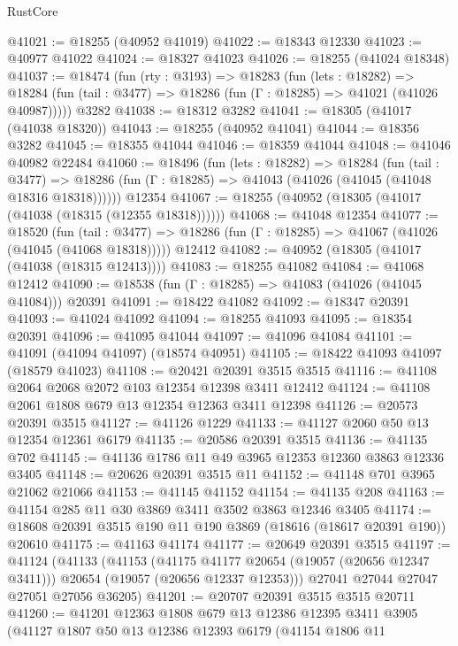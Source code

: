 \begin{lexlean}{RustCore}
\begin{coremodule}
@41021 := @18255 (@40952 @41019)
@41022 := @18343 @12330
@41023 := @40977 @41022
@41024 := @18327 @41023
@41026 := @18255 (@41024 @18348)
@41037 := @18474
    (fun (rty : @3193) =>
    @18283
      (fun (lets : @18282) =>
      @18284 (fun (tail : @3477) => @18286 (fun (Γ : @18285) => @41021 (@41026 @40987)))))
    @3282
@41038 := @18312 @3282
@41041 := @18305 (@41017 (@41038 @18320))
@41043 := @18255 (@40952 @41041)
@41044 := @18356 @3282
@41045 := @18355 @41044
@41046 := @18359 @41044
@41048 := @41046 @40982 @22484
@41060 := @18496
    (fun (lets : @18282) =>
    @18284
      (fun (tail : @3477) =>
      @18286 (fun (Γ : @18285) => @41043 (@41026 (@41045 (@41048 @18316 @18318))))))
    @12354
@41067 := @18255 (@40952 (@18305 (@41017 (@41038 (@18315 (@12355 @18318))))))
@41068 := @41048 @12354
@41077 := @18520
    (fun (tail : @3477) => @18286 (fun (Γ : @18285) => @41067 (@41026 (@41045 (@41068 @18318)))))
    @12412
@41082 := @40952 (@18305 (@41017 (@41038 (@18315 @12413))))
@41083 := @18255 @41082
@41084 := @41068 @12412
@41090 := @18538 (fun (Γ : @18285) => @41083 (@41026 (@41045 @41084))) @20391
@41091 := @18422 @41082
@41092 := @18347 @20391
@41093 := @41024 @41092
@41094 := @18255 @41093
@41095 := @18354 @20391
@41096 := @41095 @41044
@41097 := @41096 @41084
@41101 := @41091 (@41094 @41097) (@18574 @40951)
@41105 := @18422 @41093 @41097 (@18579 @41023)
@41108 := @20421 @20391 @3515 @3515
@41116 := @41108 @2064 @2068 @2072 @103 @12354 @12398 @3411 @12412
@41124 := @41108 @2061 @1808 @679 @13 @12354 @12363 @3411 @12398
@41126 := @20573 @20391 @3515
@41127 := @41126 @1229
@41133 := @41127 @2060 @50 @13 @12354 @12361 @6179
@41135 := @20586 @20391 @3515
@41136 := @41135 @702
@41145 := @41136 @1786 @11 @49 @3965 @12353 @12360 @3863 @12336 @3405
@41148 := @20626 @20391 @3515 @11
@41152 := @41148 @701 @3965 @21062 @21066
@41153 := @41145 @41152
@41154 := @41135 @208
@41163 := @41154 @285 @11 @30 @3869 @3411 @3502 @3863 @12346 @3405
@41174 := @18608 @20391 @3515 @190 @11 @190 @3869 (@18616 (@18617 @20391 @190)) @20610
@41175 := @41163 @41174
@41177 := @20649 @20391 @3515
@41197 := @41124
    (@41133
      (@41153
        (@41175 @41177 @20654 (@19057 (@20656 @12347 @3411)))
        @20654
        (@19057 (@20656 @12337 @12353)))
      @27041
      @27044
      @27047
      @27051
      @27056
      @36205)
@41201 := @20707 @20391 @3515 @3515 @20711
@41260 := @41201
    @12363
    @1808
    @679
    @13
    @12386
    @12395
    @3411
    @3905
    (@41127
      @1807
      @50
      @13
      @12386
      @12393
      @6179
      (@41154
        @1806
        @11

\end{coremodule}
\end{lexlean}
